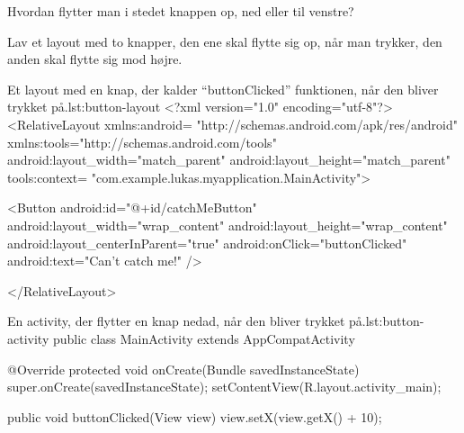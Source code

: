 \begin{exercise}
	Hvordan flytter man i stedet knappen op, ned eller til venstre?
\end{exercise}

\begin{exercise}
	Lav et layout med to knapper, den ene skal flytte sig op, når man trykker, 
	den anden skal flytte sig mod højre.
\end{exercise}

\clearpage


\begin{XmlCode}{Et layout med en knap, der kalder ``buttonClicked'' funktionen, %
når den bliver trykket på.}{lst:button-layout}
	<?xml version="1.0" encoding="utf-8"?>
	<RelativeLayout 
		xmlns:android=
			"http://schemas.android.com/apk/res/android"
		xmlns:tools="http://schemas.android.com/tools"
		android:layout_width="match_parent"
		android:layout_height="match_parent"
		tools:context=
			"com.example.lukas.myapplication.MainActivity">
	
	<Button
		android:id="@+id/catchMeButton"
		android:layout_width="wrap_content"
		android:layout_height="wrap_content"
		android:layout_centerInParent="true"
		android:onClick="buttonClicked"
		android:text="Can't catch me!" />
		
	</RelativeLayout>
\end{XmlCode}

\clearpage

\begin{JavaCode}{En activity, der flytter en knap nedad, når den bliver trykket %
på.}{lst:button-activity}
	public class MainActivity extends AppCompatActivity {
		
		@Override
		protected void onCreate(Bundle savedInstanceState) {
			super.onCreate(savedInstanceState);
			setContentView(R.layout.activity_main);
		}
		
		
		public void buttonClicked(View view) {
			view.setX(view.getX() + 10);
		}
	}
\end{JavaCode}


